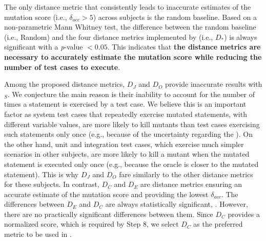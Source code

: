 The only distance metric that consistently leads to inaccurate estimates of the mutation score (i.e., $\delta_{acc}  > 5$) across subjects is the random baseline.
Based on a non-parametric Mann Whitney test, the difference between the random baseline (i.e., Random) and the four distance metrics implemented by \APPR (i.e., $D_*$) is always significant with a \textit{p}-value $< 0.05$. This indicates that \textbf{the \APPR distance metrics are necessary to accurately estimate the mutation score while reducing the number of test cases to  execute}.

Among the proposed distance metrics,
$D_J$ and $D_O$ provide inaccurate results with \SAIL{}$_S$.
We conjecture the main reason is their inability to account for the number of times a statement is exercised by a test case.
We believe this is an important factor as system test cases that repeatedly exercise mutated statements, with different variable values, are more likely to kill mutants than test cases exercising such statements only once (e.g., because of the uncertainty regarding the
). On the other hand, unit and integration test cases, which exercise much simpler scenarios in other subjects, are more likely to kill a mutant when the mutated statement is executed only once (e.g., because the oracle is closer to the mutated statement). This is why $D_J$ and $D_O$ fare similarly to the other distance metrics for these subjects.
In contrast, $D_C$ and $D_E$ are distance metrics ensuring an accurate estimate of the mutation score and providing the lowest $\delta_{acc}$. The differences between $D_E$ and $D_C$ are always statistically significant, . However, there are no practically significant differences between them.
Since $D_C$ provides a normalized score, which is required by Step 8, we select $D_C$ as the preferred metric to be used in \APPR.


